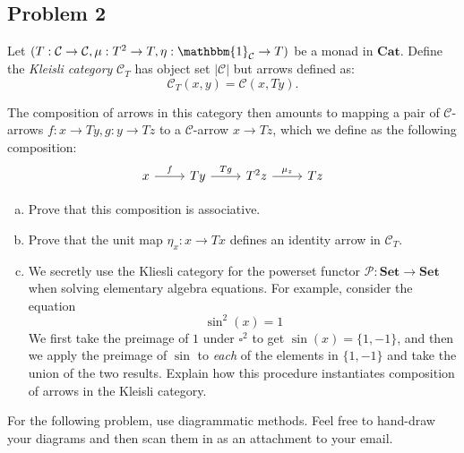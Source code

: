 \documentclass{amsart}
\theoremstyle{remark}
\theoremstyle{definition}
\theoremstyle{definition}
\newcommand{\Id}[1]{\mathbbm{1}_{#1}}
\def\Set{\mathbf{Set}}
\def\Cat{\mathbf{Cat}}
\def\mcC{\mathcal{C}}
\begin{document}
\subsection{Problem 2}

Let $(T:\mcC\to\mcC,\mu:T^2\to T,\eta:\Id{\mcC}\to T)$ be a monad in $\Cat$. Define the \emph{Kleisli category} $\mcC_T$ has object set $|\mcC|$ but arrows defined as:
\[\mcC_T(x,y)=\mcC(x,Ty).\]

The composition of arrows in this category then amounts to mapping a pair of $\mcC$-arrows $f:x\to Ty,g:y\to Tz$ to a $\mcC$-arrow $x\to Tz$, which we define as the following composition:
\[
\begin{tikzcd}
x\arrow[r,"f"] & Ty \arrow[r,"Tg"] & T^2 z \arrow[r,"\mu_z"] & Tz 
\end{tikzcd}
\]

\begin{enumerate}[(a)]
    \item Prove that this composition is associative.
    
    \item Prove that the unit map $\eta_x:x\to Tx$ defines an identity arrow in $\mcC_T$.
    
    \item We secretly use the Kliesli category for the powerset functor $\mathcal{P}:\Set\to\Set$ when solving elementary algebra equations. For example, consider the equation
    \[\sin^2(x) = 1\]
    We first take the preimage of $1$ under $\square^2$ to get $\sin(x) = \{1,-1\}$, and then we apply the preimage of $\sin$ to \emph{each} of the elements in $\{1,-1\}$ and take the union of the two results. Explain how this procedure instantiates composition of arrows in the Kleisli category.
\end{enumerate}

For the following problem, use diagrammatic methods. Feel free to hand-draw your diagrams and then scan them in as an attachment to your email.

\vspace{5 mm}
\end{document}
